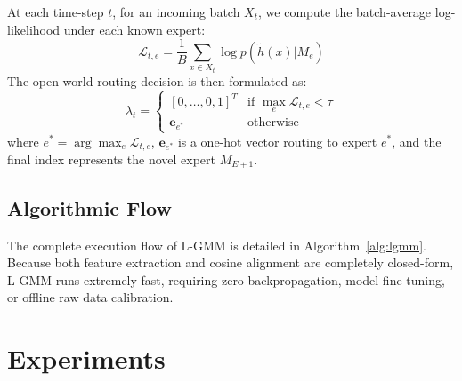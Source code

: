 \documentclass{article}
\theoremstyle{plain}
\theoremstyle{definition}
\theoremstyle{remark}
\begin{document}
At each time-step $t$, for an incoming batch $X_t$, we compute the batch-average log-likelihood under each known expert:
\begin{equation}
\mathcal{L}_{t, e} = \frac{1}{B} \sum_{x \in X_t} \log p(\tilde{h}(x) | M_e)
\end{equation}
The open-world routing decision is then formulated as:
\begin{equation}
\lambda_t = \begin{cases}
[0, \dots, 0, 1]^T & \text{if } \max_e \mathcal{L}_{t, e} < \tau \\
\mathbf{e}_{e^*} & \text{otherwise}
\end{cases}
\end{equation}
where $e^* = \arg\max_e \mathcal{L}_{t, e}$, $\mathbf{e}_{e^*}$ is a one-hot vector routing to expert $e^*$, and the final index represents the novel expert $M_{E+1}$.

\subsection{Algorithmic Flow}
\label{sec:algorithm}

The complete execution flow of L-GMM is detailed in Algorithm~\ref{alg:lgmm}. Because both feature extraction and cosine alignment are completely closed-form, L-GMM runs extremely fast, requiring zero backpropagation, model fine-tuning, or offline raw data calibration.

\section{Experiments}
\label{sec:experiments}
\end{document}
